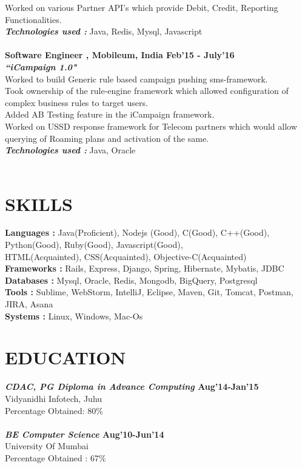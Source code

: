 \documentclass[line, margin]{res}
\begin{document}
\begin{resume}
Worked on various Partner API's which provide Debit, Credit, Reporting Functionalities.\\
\textbf{\textit{Technologies used : }} Java, Redis, Mysql, Javascript \\
\\
\textbf{Software Engineer , Mobileum, India \hfill Feb'15 - July'16} \\
\textbf{\textit{``iCampaign 1.0"}} \\
Worked to build Generic rule based campaign pushing sms-framework.\\
Took ownership of the rule-engine framework which allowed configuration of complex business rules to target users. \\
Added AB Testing feature in the iCampaign framework.\\
Worked on USSD response framework for Telecom partners which would allow querying of Roaming plans and activation of the same.\\
\textbf{\textit{Technologies used : }} Java, Oracle \\
\\

\section{SKILLS} 
\textbf{Languages : }Java(Proficient), Nodejs (Good), C(Good), C++(Good), Python(Good), Ruby(Good), Javascript(Good), \\HTML(Acquainted), CSS(Acquainted), Objective-C(Acquainted) \\
\textbf{Frameworks : }Rails, Express, Django, Spring, Hibernate, Mybatis, JDBC \\
\textbf{Databases : }Mysql, Oracle, Redis, Mongodb, BigQuery, Postgresql \\
\textbf{Tools : }Sublime, WebStorm, IntelliJ, Eclipse, Maven, Git, Tomcat, Postman, JIRA, Asana \\
\textbf{Systems : }Linux, Windows, Mac-Os

\section{EDUCATION} 
\textbf{\textit{CDAC, PG Diploma in Advance Computing} \hfill Aug'14-Jan'15} \\
Vidyanidhi Infotech, Juhu \\
Percentage Obtained: 80\% \\
\\
\textbf{\textit{BE Computer Science} \hfill Aug'10-Jun'14} \\
University Of Mumbai \\
Percentage Obtained : 67\% \\

\end{resume}
\end{document}
